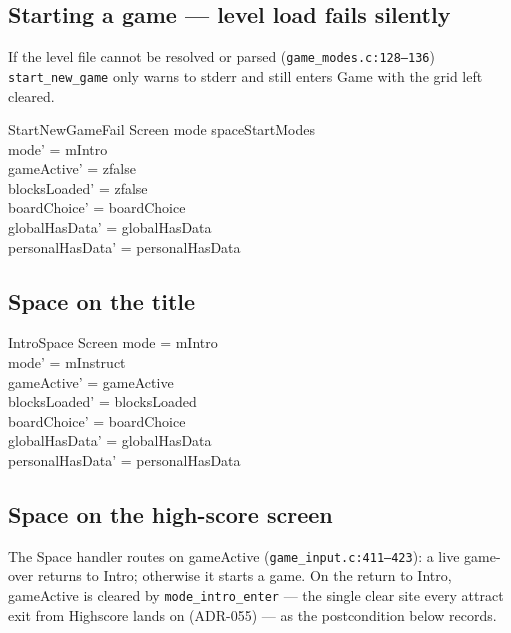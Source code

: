 \documentclass[a4paper,10pt,fleqn]{article}
\begin{document}
\subsection{Starting a game --- level load fails silently}

If the level file cannot be resolved or parsed
(\texttt{game\_modes.c:128--136}) \texttt{start\_new\_game} only warns
to stderr and still enters \textsf{Game} with the grid left cleared.

\begin{schema}{StartNewGameFail}
  \Delta Screen
  \where
  mode \in spaceStartModes \\
  mode' = mIntro \\
  gameActive' = zfalse \\
  blocksLoaded' = zfalse \\
  boardChoice' = boardChoice \\
  globalHasData' = globalHasData \\
  personalHasData' = personalHasData
\end{schema}

\subsection{Space on the title}

\begin{schema}{IntroSpace}
  \Delta Screen
  \where
  mode = mIntro \\
  mode' = mInstruct \\
  gameActive' = gameActive \\
  blocksLoaded' = blocksLoaded \\
  boardChoice' = boardChoice \\
  globalHasData' = globalHasData \\
  personalHasData' = personalHasData
\end{schema}

\subsection{Space on the high-score screen}

The \textsf{Space} handler routes on \textsf{gameActive}
(\texttt{game\_input.c:411--423}): a live game-over returns to
\textsf{Intro}; otherwise it starts a game.  On the return to
\textsf{Intro}, \textsf{gameActive} is cleared by
\texttt{mode\_intro\_enter} --- the single clear site every attract exit
from \textsf{Highscore} lands on (ADR-055) --- as the postcondition below
records.
\end{document}

